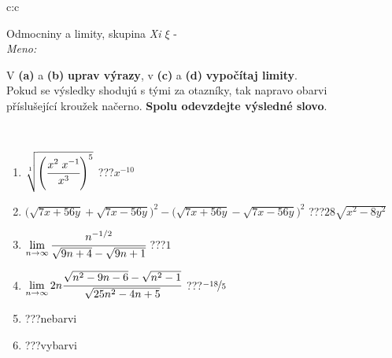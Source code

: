 \documentclass[10pt]{report}
\begin{document}
\newpage
\thispagestyle{empty}
\begin{tabular}{c:c}
\begin{minipage}[c][104.5mm][t]{0.5\linewidth}
\begin{center}
\vspace{7mm}
{\huge Odmocniny a limity, skupina \textit{Xi $\xi$} -}\\[5mm]
\textit{Meno:}\phantom{xxxxxxxxxxxxxxxxxxxxxxxxxxxxxxxxxxxxxxxxxxxxxxxxxxxxxxxxxxxxxxxxx}\\[5mm]
\begin{minipage}{0.95\linewidth}
\begin{center}
V \textbf{(a)} a \textbf{(b)} \textbf{uprav výrazy}, v \textbf{(c)} a \textbf{(d)} \textbf{vypočítaj limity}.\\Pokud se výsledky shodujú s tými za otazníky, tak napravo obarvi\\příslušející kroužek načerno. \textbf{Spolu odevzdejte výsledné slovo}.
\end{center}
\end{minipage}
\\[1mm]
\begin{minipage}{0.79\linewidth}
\begin{center}
\begin{varwidth}{\linewidth}
\begin{enumerate}
\small
\item $\sqrt[1]{\left(\cfrac{x^{2}\;x^{-1}}{x^{3}}\right)^{5}}$\quad \dotfill\; ???\;\dotfill \quad $x^{-10}$
\item {\footnotesize{\scriptsize$\big(\sqrt{7x+56y}+\sqrt{7x-56y}\big)^2-\big(\sqrt{7x+56y}-\sqrt{7x-56y}\big)^2$}\quad \dotfill\; ???\;\dotfill \quad $28\sqrt{x^2-8y^2}$}
\item $\lim\limits_{n\to\infty}\cfrac{n^{-1/2}}{\sqrt{9n+4}-\sqrt{9n+1}}$\quad \dotfill\; ???\;\dotfill \quad $1$
\item $\lim\limits_{n\to\infty}2n\cfrac{\sqrt{n^2-9n-6}-\sqrt{n^2-1}}{\sqrt{25n^2-4n+5}}$\quad \dotfill\; ???\;\dotfill \quad $\nicefrac{-18}{5}$
\item \quad \dotfill\; ???\;\dotfill \quad nebarvi
\item \quad \dotfill\; ???\;\dotfill \quad vybarvi
\end{enumerate}
\end{varwidth}
\end{center}
\end{minipage}
\begin{minipage}{0.20\linewidth}
\begin{center}

\end{center}
\end{minipage}
\end{center}
\end{minipage}
\end{tabular}
\end{document}
